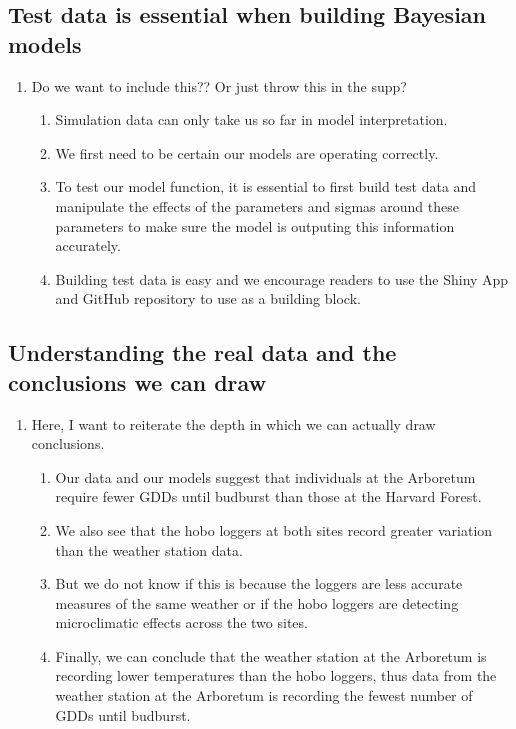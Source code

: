 \documentclass{article}\usepackage[]{graphicx}\usepackage[]{color}
\begin{document}
\subsection*{Test data is essential when building Bayesian models}
\begin{enumerate}
\item Do we want to include this?? Or just throw this in the supp?
  \begin{enumerate}
  \item Simulation data can only take us so far in model interpretation. 
  \item We first need to be certain our models are operating correctly.
  \item To test our model function, it is essential to first build test data and manipulate the effects of the parameters and sigmas around these parameters to make sure the model is outputing this information accurately.
  \item Building test data is easy and we encourage readers to use the Shiny App and GitHub repository to use as a building block. 
  \end{enumerate}
\end{enumerate}

\subsection*{Understanding the real data and the conclusions we can draw}
\begin{enumerate}
\item Here, I want to reiterate the depth in which we can actually draw conclusions.
  \begin{enumerate}
  \item Our data and our models suggest that individuals at the Arboretum require fewer GDDs until budburst than those at the Harvard Forest.
  \item We also see that the hobo loggers at both sites record greater variation than the weather station data.
  \item But we do not know if this is because the loggers are less accurate measures of the same weather or if the hobo loggers are detecting microclimatic effects across the two sites. 
  \item Finally, we can conclude that the weather station at the Arboretum is recording lower temperatures than the hobo loggers, thus data from the weather station at the Arboretum is recording the fewest number of GDDs until budburst. %
  \end{enumerate}
\end{enumerate}
\end{document}
